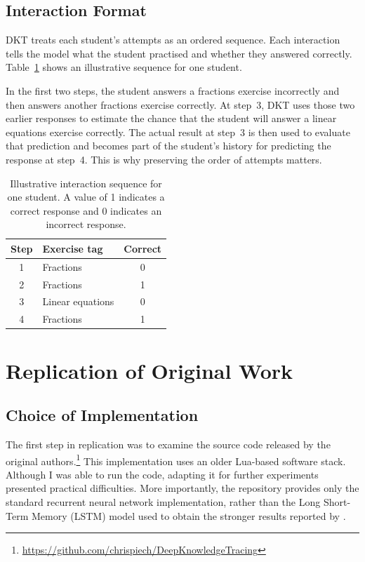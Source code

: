 \documentclass[11pt]{article}
\begin{document}
\subsection{Interaction Format}

DKT treats each student's attempts as an ordered sequence. Each
interaction tells the model what the student practised and whether
they answered correctly. Table~\ref{tab:interaction-example} shows
an illustrative sequence for one student.

In the first two steps, the student answers a fractions exercise
incorrectly and then answers another fractions exercise correctly.
At step~3, DKT uses those two earlier responses to estimate the
chance that the student will answer a linear equations exercise
correctly. The actual result at step~3 is then used to evaluate that
prediction and becomes part of the student's history for predicting
the response at step~4. This is why preserving the order of attempts
matters.

\begin{table}[H]
\centering
\begin{tabular}{clc}
\hline
Step & Exercise tag & Correct \\
\hline
1 & Fractions        & 0 \\
2 & Fractions        & 1 \\
3 & Linear equations & 0 \\
4 & Fractions        & 1 \\
\hline
\end{tabular}
\caption{Illustrative interaction sequence for one student.
A value of 1 indicates a correct response and 0 indicates an
incorrect response.}
\label{tab:interaction-example}
\end{table}

\section{Replication of Original Work}

\subsection{Choice of Implementation}

The first step in replication was to examine the source code released by the original authors.\footnote{\url{https://github.com/chrispiech/DeepKnowledgeTracing}} This implementation uses an older Lua-based software stack. Although I was able to run the code, adapting it for further experiments presented practical difficulties. More importantly, the repository provides only the standard recurrent neural network implementation, rather than the Long Short-Term Memory (LSTM) model used to obtain the stronger results reported by \citet{piech2015deep}.
\end{document}
